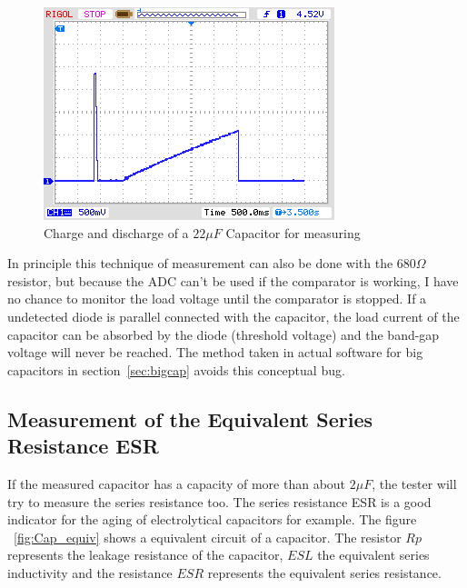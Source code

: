 \begin{figure}[H]
  \centering
    \includegraphics[]{../PNG/charge_22uF.png}
  \caption{Charge and discharge of a \(22\mu F\) Capacitor for measuring}
  \label{pic:c22uF}
\end{figure}


In principle this technique of measurement can also be done with the \(680\Omega\) resistor, but 
because the ADC can't be used if the comparator is working, I have no chance to monitor the
load voltage until the comparator is stopped. If a undetected diode is parallel connected with
the capacitor, the load current of the capacitor can be absorbed by the diode (threshold voltage) and
the band-gap voltage will never be reached.
The method taken in actual software for big capacitors in section~\ref{sec:bigcap}
avoids this conceptual bug.

\subsection{Measurement of the Equivalent Series Resistance ESR}
If the measured capacitor has a capacity of more than about \(2 \mu F\), the tester will try to measure
the series resistance too.
The series resistance ESR \cite{ESR} is a good indicator for the aging of electrolytical capacitors for example.
The figure ~\ref{fig:Cap_equiv} shows a equivalent circuit of a capacitor.
The resistor \(Rp\) represents the leakage resistance of the capacitor, \(ESL\) the equivalent series inductivity and
the resistance \(ESR\) represents the equivalent series resistance.

